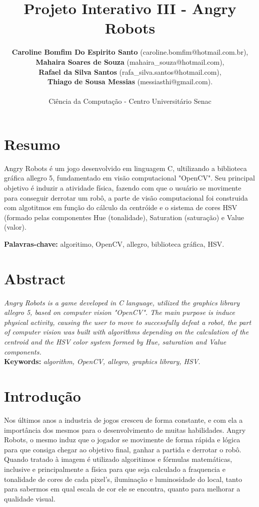 \documentclass[12pt,openright,twoside,a4paper,brazil]{abntex2}
\title{Projeto Interativo III - Angry Robots}
\date{}
\author{\textbf{Caroline Bomfim Do Espirito Santo} (caroline.bomfim@hotmail.com.br), \\ \textbf{Mahaira Soares de Souza} (mahaira\_souza@hotmail.com), \\ \textbf{Rafael da Silva Santos} (rafa\_silva.santos@hotmail.com), \\ \textbf{Thiago de Sousa Messias} (messiasthi@gmail.com). \\ \\ Ciência da Computação - Centro Universitário Senac}
\begin{document}
\maketitle
 
\section*{Resumo}

Angry Robots é um jogo desenvolvido em linguagem C, ultilizando a biblioteca gráfica allegro 5, fundamentado em visão computacional "OpenCV". Seu principal objetivo é induzir a atividade física, fazendo com que o usuário se movimente para conseguir derrotar um robô, a parte de visão computacional foi construida com algotitmos em função do cálculo da centróide e o sistema de cores HSV (formado pelas componentes Hue (tonalidade), Saturation (saturação) e Value (valor).

\textbf{Palavras-chave:} algoritimo, OpenCV, allegro, biblioteca gráfica, HSV.

\section*{Abstract}

\textit{Angry Robots is a game developed in C language, utilized the graphics library allegro 5, based on computer vision "OpenCV". The main purpose is induce physical activity, causing the user to move to successfully defeat a robot, the part of computer vision was built with algorithms depending on the calculation of the centroid and the HSV color system formed by Hue, saturation and Value components.} \\

\textbf{Keywords:}\textit{ algorithm, OpenCV, allegro, graphics library, HSV.} 

\section*{Introdução}

Nos últimos anos a industria de jogos cresceu de forma constante, e com ela a importância dos mesmos para o desenvolvimento de muitas habilidades. 
Angry Robots, o mesmo induz que o jogador se movimente de forma rápida e lógica para que consiga chegar ao objetivo final, ganhar a partida e derrotar o robô.
Quando tratado à imagem é utilizado algoritimos e fórmulas matemáticas, inclusive e principalmente a física para que seja calculado a fraquencia e tonalidade de cores de cada pixel's, iluminação e luminosidade do local, tanto para sabermos em qual escala de cor ele se encontra, quanto para melhorar a qualidade visual.
\end{document}
